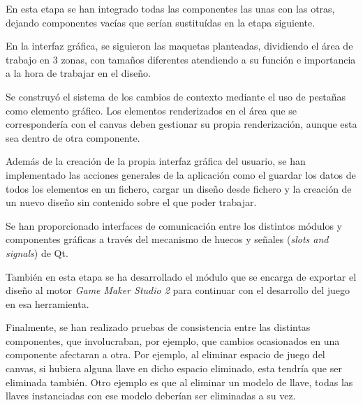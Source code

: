 En esta etapa se han integrado todas las componentes las unas con las otras, dejando componentes vacías que serían sustituídas en la etapa siguiente.

En la interfaz gráfica, se siguieron las maquetas planteadas, dividiendo el área de trabajo en 3 zonas, con tamaños diferentes atendiendo a su función e importancia a la hora de trabajar en el diseño.

Se construyó el sistema de los cambios de contexto mediante el uso de pestañas como elemento gráfico. Los elementos renderizados en el área que se correspondería con el canvas deben gestionar su propia renderización, aunque esta sea dentro de otra componente.

Además de la creación de la propia interfaz gráfica del usuario, se han implementado las acciones generales de la aplicación como el guardar los datos de todos los elementos en un fichero, cargar un diseño desde fichero y la creación de un nuevo diseño sin contenido sobre el que poder trabajar.

Se han proporcionado interfaces de comunicación entre los distintos módulos y componentes gráficas a través del mecanismo de huecos y señales (\textit{slots and signals}) de Qt.

También en esta etapa se ha desarrollado el módulo que se encarga de exportar el diseño al motor \textit{Game Maker Studio 2} para continuar con el desarrollo del juego en esa herramienta.

Finalmente, se han realizado pruebas de consistencia entre las distintas componentes, que involucraban, por ejemplo, que cambios ocasionados en una componente afectaran a otra. Por ejemplo, al eliminar espacio de juego del canvas, si hubiera alguna llave en dicho espacio eliminado, esta tendría que ser eliminada también. Otro ejemplo es que al eliminar un modelo de llave, todas las llaves instanciadas con ese modelo deberían ser eliminadas a su vez.